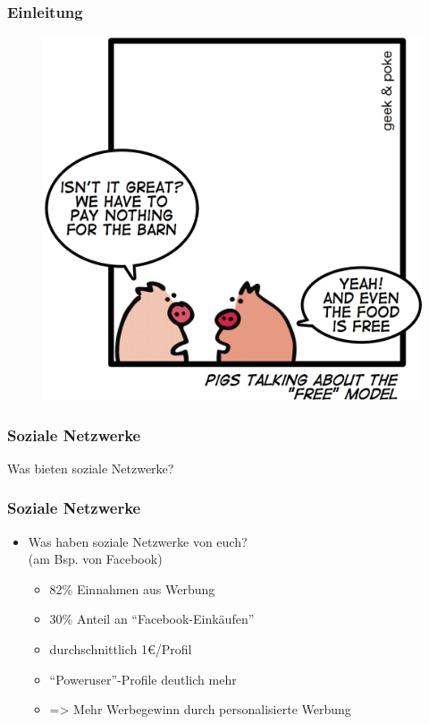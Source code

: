 \documentclass[12pt]{beamer}
\begin{document}
\begin{frame}
  \frametitle{Einleitung}
  \begin{figure}
    \includegraphics[height=0.7\textheight]{img/business_pigs.jpg}
  \end{figure}
\end{frame}

\begin{frame}
  \frametitle{Soziale Netzwerke}

  \begin{center} \Large
     Was bieten soziale Netzwerke?
  \end{center}
\end{frame}

\begin{frame}
  \frametitle{Soziale Netzwerke}

  \begin{itemize}
    \item Was haben soziale Netzwerke von euch?\\(am Bsp. von Facebook)
      \begin{itemize}
        \item<2-> 82\% Einnahmen aus Werbung
        \item<3-> 30\% Anteil an "`Facebook-Einkäufen"'
        \item<4-> durchschnittlich 1€/Profil
        \item<5-> "`Poweruser"'-Profile deutlich mehr
        \item<6-> => Mehr Werbegewinn durch personalisierte Werbung
      \end{itemize}
  \end{itemize}
\end{frame}
\end{document}
